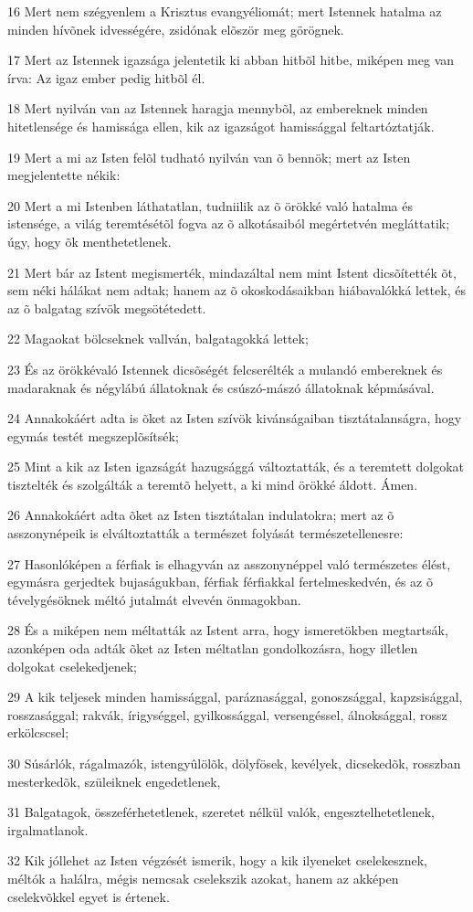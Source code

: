 \par 16 Mert nem szégyenlem a Krisztus evangyéliomát; mert Istennek hatalma az  minden hívõnek idvességére, zsidónak elõször meg görögnek.
\par 17 Mert az Istennek igazsága jelentetik ki abban hitbõl hitbe, miképen meg van írva: Az igaz ember pedig hitbõl él.
\par 18 Mert nyilván van az Istennek haragja mennybõl, az embereknek minden hitetlensége és hamissága ellen, kik az igazságot hamissággal  feltartóztatják.
\par 19 Mert a mi az Isten felõl tudható nyilván van õ bennök; mert az Isten megjelentette nékik:
\par 20 Mert a mi Istenben láthatatlan, tudniilik az õ örökké való hatalma és istensége, a világ teremtésétõl fogva az õ alkotásaiból megértetvén megláttatik; úgy, hogy õk menthetetlenek.
\par 21 Mert bár az Istent megismerték, mindazáltal nem mint Istent dicsõítették õt, sem néki hálákat nem adtak; hanem az õ okoskodásaikban hiábavalókká lettek, és az õ balgatag szívök megsötétedett.
\par 22 Magaokat bölcseknek vallván, balgatagokká lettek;
\par 23 És az örökkévaló Istennek dicsõségét felcserélték a mulandó embereknek és madaraknak és négylábú állatoknak és csúszó-mászó állatoknak képmásával.
\par 24 Annakokáért adta is õket az Isten szívök kivánságaiban tisztátalanságra, hogy egymás testét megszeplõsítsék;
\par 25 Mint a kik az Isten igazságát hazugsággá változtatták, és a teremtett dolgokat tisztelték és szolgálták a teremtõ helyett, a ki mind örökké áldott. Ámen.
\par 26 Annakokáért adta õket az Isten tisztátalan indulatokra; mert az õ asszonynépeik is elváltoztatták a természet folyását természetellenesre:
\par 27 Hasonlóképen a férfiak is elhagyván az asszonynéppel való természetes élést, egymásra gerjedtek bujaságukban, férfiak férfiakkal fertelmeskedvén, és az õ tévelygésöknek méltó jutalmát elvevén önmagokban.
\par 28 És a miképen nem méltatták az Istent arra, hogy ismeretökben megtartsák, azonképen oda adták õket az Isten méltatlan gondolkozásra, hogy illetlen dolgokat cselekedjenek;
\par 29 A kik teljesek minden hamissággal, paráznasággal, gonoszsággal, kapzsisággal, rosszasággal; rakvák, írigységgel, gyilkossággal, versengéssel, álnoksággal, rossz erkölcscsel;
\par 30 Súsárlók, rágalmazók, istengyûlölõk, dölyfösek, kevélyek, dicsekedõk, rosszban mesterkedõk, szüleiknek engedetlenek,
\par 31 Balgatagok, összeférhetetlenek, szeretet nélkül valók, engesztelhetetlenek, irgalmatlanok.
\par 32 Kik jóllehet az Isten végzését ismerik, hogy a kik ilyeneket cselekesznek, méltók a halálra, mégis nemcsak cselekszik azokat, hanem az akképen cselekvõkkel egyet is értenek.

